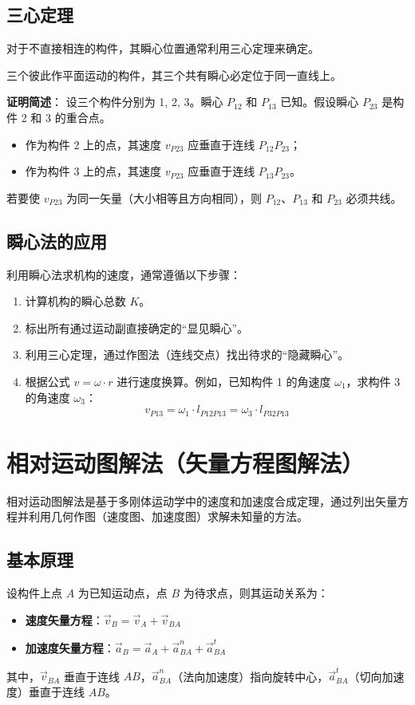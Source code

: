 	\subsection{三心定理}
	对于不直接相连的构件，其瞬心位置通常利用三心定理来确定。
	
	\begin{theorem}[三心定理]
		三个彼此作平面运动的构件，其三个共有瞬心必定位于同一直线上。
	\end{theorem}
	
	\textbf{证明简述}：
	设三个构件分别为 1, 2, 3。瞬心 $P_{12}$ 和 $P_{13}$ 已知。假设瞬心 $P_{23}$ 是构件 2 和 3 的重合点。
	\begin{itemize}
		\item 作为构件 2 上的点，其速度 $v_{P23}$ 应垂直于连线 $P_{12}P_{23}$；
		\item 作为构件 3 上的点，其速度 $v_{P23}$ 应垂直于连线 $P_{13}P_{23}$。
	\end{itemize}
	若要使 $v_{P23}$ 为同一矢量（大小相等且方向相同），则 $P_{12}$、$P_{13}$ 和 $P_{23}$ 必须共线。
	
	\subsection{瞬心法的应用}
	利用瞬心法求机构的速度，通常遵循以下步骤：
	\begin{enumerate}
		\item 计算机构的瞬心总数 $K$。
		\item 标出所有通过运动副直接确定的“显见瞬心”。
		\item 利用三心定理，通过作图法（连线交点）找出待求的“隐藏瞬心”。
		\item 根据公式 $v = \omega \cdot r$ 进行速度换算。例如，已知构件 1 的角速度 $\omega_1$，求构件 3 的角速度 $\omega_3$：
		\begin{equation}
			v_{P13} = \omega_1 \cdot l_{P12P13} = \omega_3 \cdot l_{P32P13}
		\end{equation}
	\end{enumerate}


\section{相对运动图解法（矢量方程图解法）}

相对运动图解法是基于多刚体运动学中的速度和加速度合成定理，通过列出矢量方程并利用几何作图（速度图、加速度图）求解未知量的方法。

\subsection{基本原理}
设构件上点 $A$ 为已知运动点，点 $B$ 为待求点，则其运动关系为：
\begin{itemize}
	\item \textbf{速度矢量方程}：$\vec{v}_B = \vec{v}_A + \vec{v}_{BA}$
	\item \textbf{加速度矢量方程}：$\vec{a}_B = \vec{a}_A + \vec{a}_{BA}^n + \vec{a}_{BA}^t$
\end{itemize}
其中，$\vec{v}_{BA}$ 垂直于连线 $AB$，$\vec{a}_{BA}^n$（法向加速度）指向旋转中心，$\vec{a}_{BA}^t$（切向加速度）垂直于连线 $AB$。

